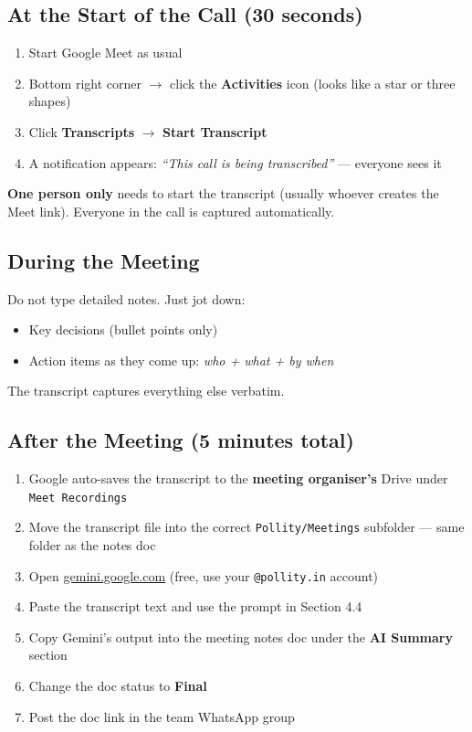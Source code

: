 \documentclass[11pt, a4paper]{article}
\begin{document}
\subsection{At the Start of the Call (30 seconds)}

\begin{enumerate}[leftmargin=1.5em]
  \item Start Google Meet as usual
  \item Bottom right corner $\to$ click the \textbf{Activities} icon (looks like a star or three shapes)
  \item Click \textbf{Transcripts} $\to$ \textbf{Start Transcript}
  \item A notification appears: \textit{``This call is being transcribed''} --- everyone sees it
\end{enumerate}

\begin{notebox}
\textbf{One person only} needs to start the transcript (usually whoever creates the Meet link). Everyone in the call is captured automatically.
\end{notebox}

\subsection{During the Meeting}

Do not type detailed notes. Just jot down:
\begin{itemize}[leftmargin=1.5em]
  \item Key decisions (bullet points only)
  \item Action items as they come up: \textit{who + what + by when}
\end{itemize}
The transcript captures everything else verbatim.

\subsection{After the Meeting (5 minutes total)}

\begin{enumerate}[leftmargin=1.5em]
  \item Google auto-saves the transcript to the \textbf{meeting organiser's} Drive under \texttt{Meet Recordings}
  \item Move the transcript file into the correct \texttt{Pollity/Meetings} subfolder --- same folder as the notes doc
  \item Open \href{https://gemini.google.com}{gemini.google.com} (free, use your \texttt{@pollity.in} account)
  \item Paste the transcript text and use the prompt in Section 4.4
  \item Copy Gemini's output into the meeting notes doc under the \textbf{AI Summary} section
  \item Change the doc status to \textbf{Final}
  \item Post the doc link in the team WhatsApp group
\end{enumerate}
\end{document}
